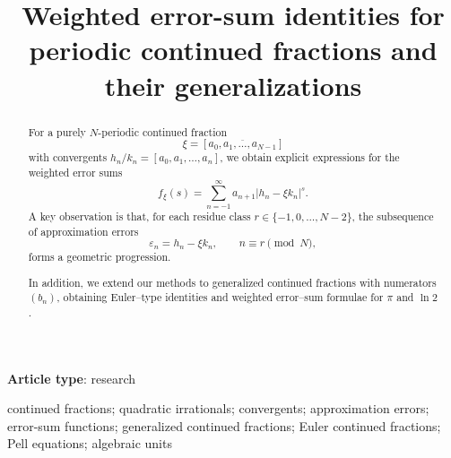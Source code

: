 \documentclass[]{interact}
\makeatletter
\newcommand{\monthyear}[1]{%
  \def\@monthyear{\uppercase{#1}}}
\newcommand{\volnumber}[1]{%
  \def\@volnumber{\uppercase{#1}}}
\theoremstyle{plain}
\numberwithin{equation}{section} %
\numberwithin{table}{section} %
\numberwithin{figure}{section}
\makeatother
\begin{document}
\monthyear{Month Year}
\volnumber{Volume, Number}
\setcounter{page}{1}

\title{Weighted error-sum identities for periodic continued fractions and their generalizations}

\author{
}

\maketitle



{\bf Article type}: research %
\bigskip

\begin{abstract}For a purely \(N\)-periodic continued fraction
\[
\xi=[\overline{a_0,a_1,\dots,a_{N-1}}]
\]
with convergents \(h_n/k_n=[a_0,a_1,\dots,a_n]\), we obtain explicit
expressions for the weighted error sums
\[
f_\xi(s)=\sum_{n=-1}^{\infty}a_{n+1}|h_n-\xi k_n|^s.
\]
A key observation is that, for each residue class
\(r\in\{-1,0,\dots,N-2\}\), the subsequence of approximation errors
\[
\varepsilon_n=h_n-\xi k_n,\qquad n\equiv r\pmod N,
\]
forms a geometric progression. 

In addition, we extend our methods to generalized continued fractions with 
numerators $(b_n)$, obtaining Euler–type identities and weighted error–sum 
formulae for $\pi$ and $\ln 2$.  

\end{abstract}

\begin{keywords}
	continued fractions; quadratic irrationals; convergents; approximation errors; error-sum functions; generalized continued fractions; Euler continued fractions; Pell equations; algebraic units
\end{keywords}

	
\end{document}
